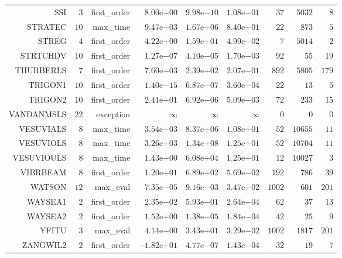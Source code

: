 \begin{longtable}{rrrrrrrrr}
SSI & \(     3\) & first\_order & \( 8.00\)e\(+00\) & \( 9.98\)e\(-10\) & \( 1.08\)e\(-01\) & \(    37\) & \(  5032\) & \(     8\) \\
STRATEC & \(    10\) & max\_time & \( 9.47\)e\(+03\) & \( 1.67\)e\(+06\) & \( 8.40\)e\(+01\) & \(    22\) & \(   873\) & \(     5\) \\
STREG & \(     4\) & first\_order & \( 4.22\)e\(+00\) & \( 1.59\)e\(+01\) & \( 4.99\)e\(-02\) & \(     7\) & \(  5014\) & \(     2\) \\
STRTCHDV & \(    10\) & first\_order & \( 1.27\)e\(-07\) & \( 4.10\)e\(-05\) & \( 1.70\)e\(-03\) & \(    92\) & \(    55\) & \(    19\) \\
THURBERLS & \(     7\) & first\_order & \( 7.60\)e\(+03\) & \( 2.39\)e\(+02\) & \( 2.07\)e\(-01\) & \(   892\) & \(  5805\) & \(   179\) \\
TRIGON1 & \(    10\) & first\_order & \( 1.40\)e\(-15\) & \( 6.87\)e\(-07\) & \( 3.60\)e\(-04\) & \(    22\) & \(    13\) & \(     5\) \\
TRIGON2 & \(    10\) & first\_order & \( 2.41\)e\(+01\) & \( 6.92\)e\(-06\) & \( 5.09\)e\(-03\) & \(    72\) & \(   233\) & \(    15\) \\
VANDANMSLS & \(    22\) & exception & \(\infty\) & \(\infty\) & \(\infty\) & \(     0\) & \(     0\) & \(     0\) \\
VESUVIALS & \(     8\) & max\_time & \( 3.54\)e\(+03\) & \( 8.37\)e\(+06\) & \( 1.08\)e\(+01\) & \(    52\) & \( 10655\) & \(    11\) \\
VESUVIOLS & \(     8\) & max\_time & \( 3.26\)e\(+03\) & \( 1.34\)e\(+08\) & \( 1.25\)e\(+01\) & \(    52\) & \( 10704\) & \(    11\) \\
VESUVIOULS & \(     8\) & max\_time & \( 1.43\)e\(+00\) & \( 6.08\)e\(+04\) & \( 1.25\)e\(+01\) & \(    12\) & \( 10027\) & \(     3\) \\
VIBRBEAM & \(     8\) & first\_order & \( 1.20\)e\(+01\) & \( 6.89\)e\(+02\) & \( 5.69\)e\(-02\) & \(   192\) & \(   786\) & \(    39\) \\
WATSON & \(    12\) & max\_eval & \( 7.35\)e\(-05\) & \( 9.16\)e\(-03\) & \( 3.47\)e\(-02\) & \(  1002\) & \(   601\) & \(   201\) \\
WAYSEA1 & \(     2\) & first\_order & \( 2.35\)e\(-02\) & \( 5.93\)e\(-01\) & \( 2.64\)e\(-04\) & \(    62\) & \(    37\) & \(    13\) \\
WAYSEA2 & \(     2\) & first\_order & \( 1.52\)e\(+00\) & \( 1.38\)e\(-05\) & \( 1.84\)e\(-04\) & \(    42\) & \(    25\) & \(     9\) \\
YFITU & \(     3\) & max\_eval & \( 4.14\)e\(+00\) & \( 3.43\)e\(+01\) & \( 3.29\)e\(-02\) & \(  1002\) & \(  1817\) & \(   201\) \\
ZANGWIL2 & \(     2\) & first\_order & \(-1.82\)e\(+01\) & \( 4.77\)e\(-07\) & \( 1.43\)e\(-04\) & \(    32\) & \(    19\) & \(     7\) \\\hline
\end{longtable}
